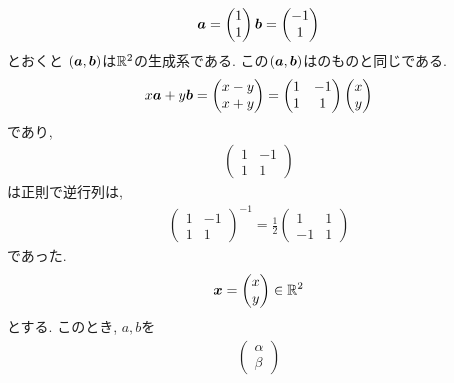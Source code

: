 \begin{example}
  \label{ex:gens:3}
  \begin{align*}
    \boldsymbol{a}=\begin{pmatrix}1\\1\end{pmatrix}
    \boldsymbol{b}=\begin{pmatrix}-1\\1\end{pmatrix}
  \end{align*}
  とおくと
  $(\boldsymbol{a},\boldsymbol{b})$は$\mathbb{R}^2$の生成系である.
  この$(\boldsymbol{a},\boldsymbol{b})$はのものと同じである.
  \begin{align*}
    x\boldsymbol{a}+y\boldsymbol{b}=
    \begin{pmatrix}
      x-y\\x+y
    \end{pmatrix}
    =
    \begin{pmatrix}
      1&-1\\1&1
    \end{pmatrix}
    \begin{pmatrix}
      x\\y
    \end{pmatrix}
  \end{align*}
  であり,
  \begin{align*}
    \begin{pmatrix}
      1&-1\\1&1
    \end{pmatrix}
  \end{align*}
  は正則で逆行列は,
  \begin{align*}
    \begin{pmatrix}
      1&-1\\1&1
    \end{pmatrix}^{-1}
=    \frac{1}{2}
    \begin{pmatrix}
      1&1\\-1&1
    \end{pmatrix}
  \end{align*}
  であった.
  \begin{align*}
    \boldsymbol{x}=
   \begin{pmatrix}
      x\\y
    \end{pmatrix}\in\mathbb{R}^2
  \end{align*}
  とする.
  このとき, $a,b$を
  \begin{align*}
    \begin{pmatrix}
      \alpha\\\beta
    \end{pmatrix}

\end{align*}
\end{example}
